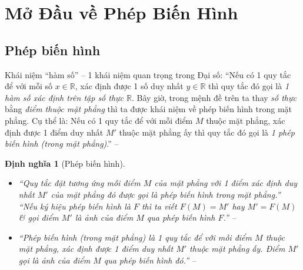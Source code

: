 \documentclass[oneside]{book}
\numberwithin{equation}{section}
\newtheorem{dinhnghia}{Định nghĩa}[section]
\begin{document}
\section{Mở Đầu về Phép Biến Hình}

\subsection{Phép biến hình}
Khái niệm ``hàm số'' -- 1 khái niệm quan trọng trong Đại số: ``Nếu có 1 quy tắc để với mỗi số $x\in\mathbb{R}$, xác định được 1 số duy nhất $y\in\mathbb{R}$ thì quy tắc đó gọi là \textit{1 hàm số xác định trên tập số thực $\mathbb{R}$}. Bây giờ, trong mệnh đề trên ta thay \textit{số thực} bằng \textit{điểm thuộc mặt phẳng} thì ta được khái niệm về phép biến hình trong mặt phẳng. Cụ thể là: Nếu có 1 quy tắc để với mỗi điểm $M$ thuộc mặt phẳng, xác định được 1 điểm duy nhất $M'$ thuộc mặt phẳng ấy thì quy tắc đó gọi là \textit{1 phép biến hình (trong mặt phẳng)}.'' -- \cite[p. 4]{SGK_Toan_11_hinh_hoc_nang_cao}

\begin{dinhnghia}[Phép biến hình]
	\begin{itemize}
		\item ``Quy tắc đặt tương ứng mỗi điểm $M$ của mặt phẳng với 1 điểm xác định duy nhất $M'$ của mặt phẳng đó được gọi là \emph{phép biến hình} trong mặt phẳng.'' ``Nếu ký hiệu phép biến hình là $F$ thì ta viết $F(M) = M'$ hay $M' = F(M)$ \& gọi điểm $M'$ là \emph{ảnh} của điểm $M$ qua phép biến hình $F$.'' -- \cite[p. 4]{SGK_Toan_11_hinh_hoc_co_ban}
		\item ``\emph{Phép biến hình} (trong mặt phẳng) là 1 quy tắc để với mỗi điểm $M$ thuộc mặt phẳng, xác định được 1 điểm duy nhất $M'$ thuộc mặt phẳng ấy. Điểm $M'$ gọi là \emph{ảnh} của điểm $M$ qua phép biến hình đó.'' -- \cite[p. 4]{SGK_Toan_11_hinh_hoc_nang_cao}
	\end{itemize}	
\end{dinhnghia}
\end{document}

